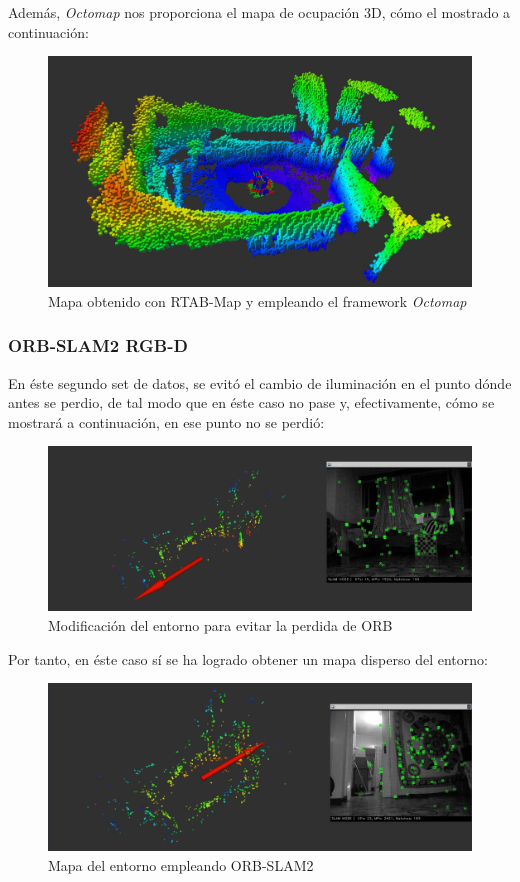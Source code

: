 Además, \textit{Octomap} nos proporciona el mapa de ocupación 3D, cómo el mostrado a continuación:
\begin{figure}[h!]
    \centering
    \includegraphics[width=.9\textwidth]{images/slam/bag3_octomap_LC}
    \caption{Mapa obtenido con RTAB-Map y empleando el framework \textit{Octomap}}
\end{figure}

\newpage
\subsubsection{ORB-SLAM2 RGB-D}
En éste segundo set de datos, se evitó el cambio de iluminación en el punto dónde antes se perdio, de tal modo que en éste caso no pase y, efectivamente, cómo se mostrará a continuación,
en ese punto no se perdió:
\begin{figure}[h!]
    \centering
    \includegraphics[width=.9\textwidth]{images/slam/bag3_orb_avoidLOSE}
    \caption{Modificación del entorno para evitar la perdida de ORB}
\end{figure}

Por tanto, en éste caso sí se ha logrado obtener un mapa disperso del entorno:
\begin{figure}[h!]
    \centering
    \includegraphics[width=.9\textwidth]{images/slam/bag3_orb_map}
    \caption{Mapa del entorno empleando ORB-SLAM2}
\end{figure}

